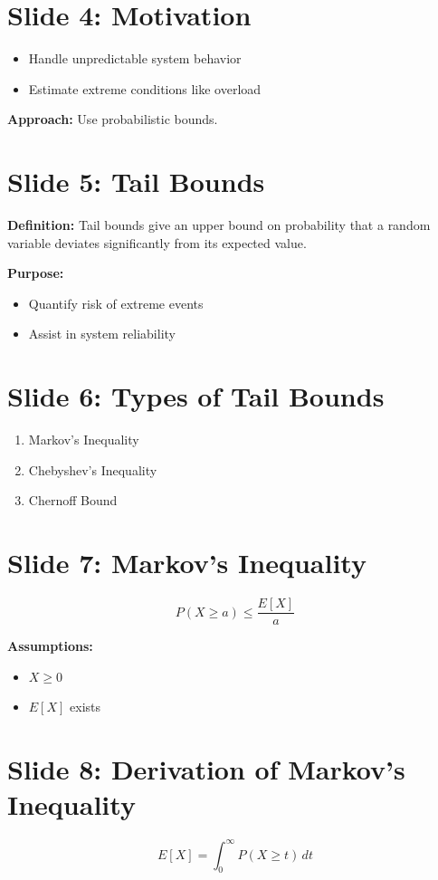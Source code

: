 \documentclass[12pt]{article}
\begin{document}
\section*{Slide 4: Motivation}
\begin{itemize}
    \item Handle unpredictable system behavior
    \item Estimate extreme conditions like overload
\end{itemize}

\textbf{Approach:} Use probabilistic bounds.

\section*{Slide 5: Tail Bounds}
\textbf{Definition:} Tail bounds give an upper bound on probability that a random variable deviates significantly from its expected value.

\textbf{Purpose:}
\begin{itemize}
    \item Quantify risk of extreme events
    \item Assist in system reliability
\end{itemize}

\section*{Slide 6: Types of Tail Bounds}
\begin{enumerate}
    \item Markov’s Inequality
    \item Chebyshev’s Inequality
    \item Chernoff Bound
\end{enumerate}

\section*{Slide 7: Markov’s Inequality}
\[
P(X \geq a) \leq \frac{E[X]}{a}
\]

\textbf{Assumptions:}
\begin{itemize}
    \item $X \geq 0$
    \item $E[X]$ exists
\end{itemize}

\section*{Slide 8: Derivation of Markov’s Inequality}
\[
E[X] = \int_0^\infty P(X \geq t)\, dt
\]
\end{document}
